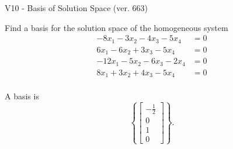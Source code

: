 \begin{exercise}
  \begin{exerciseTitle}V10 - Basis of Solution Space (ver. 663)\end{exerciseTitle}
  \begin{exerciseStatement}
    Find a basis for the solution space of the homogeneous system 
\begin{align*}
 -8 x_ 1 -3 x_ 2 -4 x_ 3 -5 x_ 4 &= 0  \\ 
  6 x_ 1 -6 x_ 2 + 3 x_ 3 -5 x_ 4 &= 0  \\ 
  -12 x_ 1 -5 x_ 2 -6 x_ 3 -2 x_ 4 &= 0  \\ 
  8 x_ 1 + 3 x_ 2 + 4 x_ 3 -5 x_ 4 &= 0  \\ 
 \end{align*}


 
  \end{exerciseStatement}

  \begin{exerciseAnswer}
   A basis is   
\[\left\{\left[\begin{array}{c}
-\frac{1}{2} \\
0 \\
1 \\
0
\end{array}\right]\right\}.\]

  


  \end{exerciseAnswer}
\end{exercise}